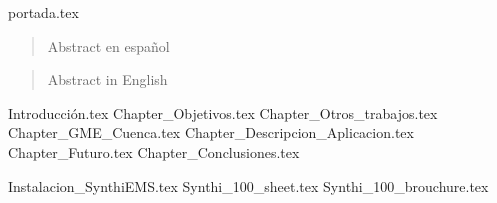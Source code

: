 \documentclass[a4paper,openany,oneside,12pt]{report}
\begin{document}

	{portada.tex}
	\newpage
	\mbox{}
	\thispagestyle{empty} %
	\pagestyle{fancy}

\onehalfspace



\begin{abstract}
	\setcounter{page}{2}
	Abstract en español
	\thispagestyle{plain}
\end{abstract}
\begin{abstract}
	\setcounter{page}{3}
	Abstract in English
	\thispagestyle{plain}
\end{abstract}


	\setcounter{page}{4}
	\tableofcontents
	\listoffigures %
	\listoftables
	


	

	{Introducción.tex}
	{Chapter_Objetivos.tex}
	{Chapter_Otros_trabajos.tex}
	{Chapter_GME_Cuenca.tex}
	{Chapter_Descripcion_Aplicacion.tex}
	{Chapter_Futuro.tex}
	{Chapter_Conclusiones.tex}
	
	
	\appendix
	\appendixpage
		{Instalacion_SynthiEMS.tex}
		{Synthi_100_sheet.tex}
		{Synthi_100_brouchure.tex}
	
	
	\nocite{Csound_book}
	\nocite{Curtis}
	\nocite{GME}
	\nocite{Lieb}
	\nocite{SC_book}
	\nocite{Supper}
	\nocite{Synthi100_brochure}
	\nocite{Synthi_Australia}
	\nocite{Synthi_users_manual}
	\nocite{the_synthesizer}
	
	
\end{document}
